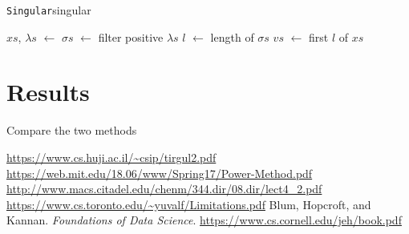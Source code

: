\documentclass{article}
\def\store{$\leftarrow$ }
\begin{document}
\begin{algo}{\texttt{Singular}}{singular}
  \begin{algorithm}[H]

    \BlankLine
    $xs$, $\lambda s$ \store {}\;
    $\sigma s$ \store filter positive $\lambda s$\;
    $l$ \store length of $\sigma s$\;
    $vs$ \store first $l$ of $xs$\;
  \end{algorithm}
\end{algo}

\section{Results}
Compare the two methods

\begin{thebibliography}{9}
   \url{https://www.cs.huji.ac.il/\~csip/tirgul2.pdf}
   \url{https://web.mit.edu/18.06/www/Spring17/Power-Method.pdf}
   \url{http://www.macs.citadel.edu/chenm/344.dir/08.dir/lect4_2.pdf}
   \url{https://www.cs.toronto.edu/\~yuvalf/Limitations.pdf}
   Blum, Hopcroft, and Kannan. \emph{Foundations of Data Science}. \url{https://www.cs.cornell.edu/jeh/book.pdf}
\end{thebibliography}
\end{document}
